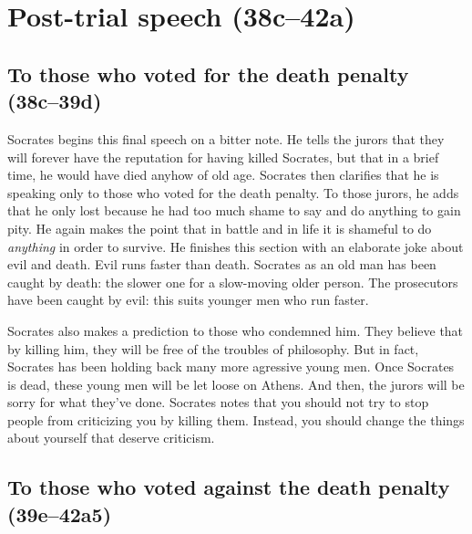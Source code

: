 \documentclass[11pt]{article}
\begin{document}

\section{Post-trial speech (38c--42a)}

\subsection{To those who voted for the death penalty (38c--39d)}

Socrates begins this final speech on a bitter note.  He tells the jurors that
they will forever have the reputation for having killed Socrates, but that in
a brief time, he would have died anyhow of old age.  Socrates then clarifies
that he is speaking only to those who voted for the death penalty.  To those
jurors, he adds that he only lost because he had too much shame to say and do
anything to gain pity.  He again makes the point that in battle and in life it
is shameful to do \emph{anything} in order to survive.  He finishes this
section with an elaborate joke about evil and death. Evil runs faster than
death.  Socrates as an old man has been caught by death: the slower one for
a slow-moving older person.  The prosecutors have been caught by evil: this
suits younger men who run faster.

Socrates also makes a prediction to those who condemned him.  They believe that
by killing him, they will be free of the troubles of philosophy.  But in fact,
Socrates has been holding back many more agressive young men.  Once Socrates is
dead, these young men will be let loose on Athens.  And then, the jurors will
be sorry for what they've done.  Socrates notes that you should not try to stop
people from criticizing you by killing them.  Instead, you should change the
things about yourself that deserve criticism.


\subsection{To those who voted against the death penalty (39e--42a5)}
\end{document}
